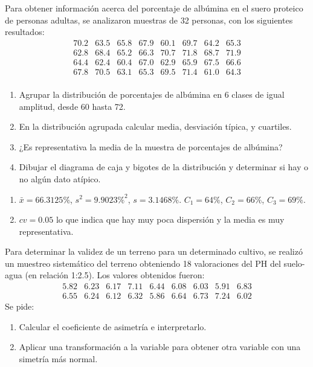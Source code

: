 {Para obtener información acerca del porcentaje de albúmina en el suero proteico de personas adultas, se analizaron muestras de 32 personas, con los siguientes resultados:
\[
\begin{array}{cccccccc}
70.2 & 63.5 & 65.8 & 67.9 & 60.1 & 69.7 & 64.2 & 65.3 \\
62.8 & 68.4 & 65.2 & 66.3 & 70.7 & 71.8 & 68.7 & 71.9 \\
64.4 & 62.4 & 60.4 & 67.0 & 62.9 & 65.9 & 67.5 & 66.6 \\
67.8 & 70.5 & 63.1 & 65.3 & 69.5 & 71.4 & 61.0 & 64.3 \\
\end{array}
\]
\begin{enumerate}
\item Agrupar la distribución de porcentajes de albúmina en 6 clases de igual amplitud, desde 60 hasta 72.
\item En la distribución agrupada calcular media, desviación típica, y cuartiles.
\item ¿Es representativa la media de la muestra de porcentajes de albúmina?
\item Dibujar el diagrama de caja y bigotes de la distribución y determinar si hay o no algún dato atípico.
\end{enumerate}
}
{\begin{enumerate}[start=2]
\item $\bar x=66.3125\%$, $s^2=9.9023\%^2$, $s=3.1468\%$. $C_1=64\%$, $C_2=66\%$, $C_3=69\%$.
\item $cv=0.05$ lo que indica que hay muy poca dispersión y la media es muy representativa.
\end{enumerate}
}
{}


{Para determinar la validez de un terreno para un determinado cultivo, se realizó un muestreo sistemático del terreno obteniendo 18 valoraciones del PH del suelo-agua (en relación 1:2.5).
Los valores obtenidos fueron:
\[
\begin{array}{ccccccccc}
5.82 & 6.23 & 6.17 & 7.11 & 6.44 & 6.08 & 6.03 & 5.91 & 6.83 \\
6.55 & 6.24 & 6.12 & 6.32 & 5.86 & 6.64 & 6.73 & 7.24 & 6.02
\end{array}
\]
Se pide:
\begin{enumerate}
\item Calcular el coeficiente de asimetría e interpretarlo.
\item Aplicar una transformación a la variable para obtener otra variable con una simetría más normal.
\end{enumerate}
}


